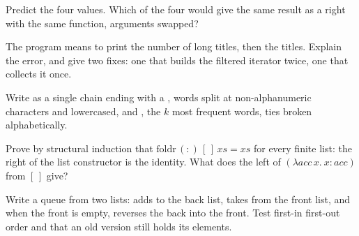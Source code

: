 \begin{exercise}[$\star\star$]\label{exo:b2:functional-programming:5}
Predict the four values. Which of the four  would give the same result as a right  with the same function,
arguments swapped?
\end{exercise}

\begin{exercise}[$\star\star$]\label{exo:b2:functional-programming:6}
The program means to print the number of long titles, then the titles. Explain the error, and give two fixes: one
that builds the filtered iterator twice, one that collects it once.
\end{exercise}

\begin{exercise}[$\star\star$]\label{exo:b2:functional-programming:7}
Write  as a single chain ending with a , words split at
non-alphanumeric characters and lowercased, and , the $k$ most frequent words, ties broken
alphabetically.
\end{exercise}

\begin{exercise}[$\star\star$]\label{exo:b2:functional-programming:8}
Prove by structural induction that $\mathrm{foldr}\,(:)\,[\,]\,xs = xs$ for every finite list: the right  of
the list constructor is the identity. What does the left  of $(\lambda acc\,x.\ x : acc)$ from $[\,]$ give?
\end{exercise}

\begin{exercise}[$\star\star$]\label{exo:b2:functional-programming:9}
Write a  queue from two  lists:  adds to the back list,  takes from the front
list, and when the front is empty, reverses the back into the front. Test first-in first-out order and that an old
version still holds its elements.
\end{exercise}


